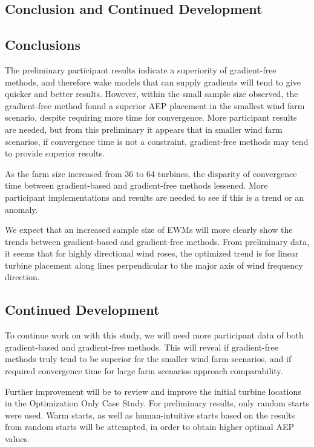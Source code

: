 \documentclass[]{aiaa-tc}
\begin{document}
\bigskip
\begin{centering}
	\section{Conclusion and Continued Development}
\end{centering}
\subsection{Conclusions}
The preliminary participant results indicate a superiority of gradient-free methods, and therefore wake models that can supply gradients will tend to give quicker and better results. However, within the small sample size observed, the gradient-free method found a superior AEP placement in the smallest wind farm scenario, despite requiring more time for convergence. More participant results are needed, but from this preliminary it appears that in smaller wind farm scenarios, if convergence time is not a constraint, gradient-free methods may tend to provide superior results.

As the farm size increased from 36 to 64 turbines, the disparity of convergence time between gradient-based and gradient-free methods lessened. More participant implementations and results are needed to see if this is a trend or an anomaly.

We expect that an increased sample size of EWMs will more clearly show the trends between gradient-based and gradient-free methods. From preliminary data, it seems that for highly directional wind roses, the optimized trend is for linear turbine placement along lines perpendicular to the major axis of wind frequency direction.

\subsection{Continued Development}
To continue work on with this study, we will need more participant data of both gradient-based and gradient-free methods. This will reveal if gradient-free methods truly tend to be superior for the smaller wind farm scenarios, and if required convergence time for large farm scenarios approach comparability.

Further improvement will be to review and improve the initial turbine locations in the Optimization Only Case Study. For preliminary results, only random starts were used. Warm starts, as well as human-intuitive starts based on the results from random starts will be attempted, in order to obtain higher optimal AEP values.
\end{document}
